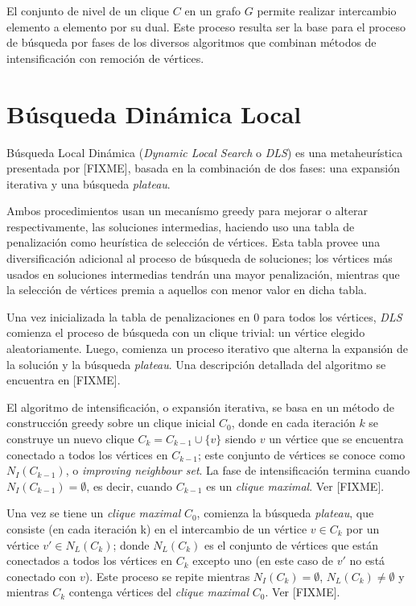 \documentclass[conference]{IEEEtran}
\begin{document}
El conjunto de nivel de un clique $C$ en un grafo $G$ permite realizar
intercambio elemento a elemento por su dual. Este proceso resulta ser
la base para el proceso de búsqueda por fases de los diversos
algoritmos que combinan métodos de intensificación con remoción de
vértices.

\section{Búsqueda Dinámica Local}
\label{sec:dls}Búsqueda Local Dinámica (\emph{Dynamic Local Search} o
\emph{DLS}) es una metaheurística presentada por [FIXME], basada en la
combinación de dos fases: una expansión iterativa y una búsqueda
\emph{plateau}.

Ambos procedimientos usan un mecanísmo greedy para mejorar o alterar
respectivamente, las soluciones intermedias, haciendo uso una tabla de
penalización como heurística de selección de vértices. Esta tabla
provee una diversificación adicional al proceso de búsqueda de
soluciones; los vértices más usados en soluciones intermedias tendrán
una mayor penalización, mientras que la selección de vértices premia a
aquellos con menor valor en dicha tabla.

Una vez inicializada la tabla de penalizaciones en $0$ para todos los
vértices, \emph{DLS} comienza el proceso de búsqueda con un clique
trivial: un vértice elegido aleatoriamente. Luego, comienza un proceso
iterativo que alterna la expansión de la solución y la búsqueda
\emph{plateau}. Una descripción detallada del algoritmo se encuentra
en [FIXME].

El algoritmo de intensificación, o expansión iterativa, se basa en un
método de construcción greedy sobre un clique inicial $C_0$, donde en
cada iteración $k$ se construye un nuevo clique $C_k = C_{k-1} \cup
\lbrace v \rbrace$ siendo $v$ un vértice que se encuentra conectado a
todos los vértices en $C_{k-1}$; este conjunto de vértices se conoce 
como $N_I(C_{k-1})$, o \emph{improving neighbour set}. La fase de
intensificación termina cuando $N_I(C_{k-1}) = \emptyset$, es decir,
cuando $C_{k-1}$ es un \emph{clique maximal}. Ver [FIXME].

Una vez se tiene un \emph{clique maximal} $C_0$, comienza la búsqueda
\emph{plateau}, que consiste (en cada iteración k) en el intercambio
de un vértice $v \in C_k$ por un vértice $v' \in N_L(C_k)$; donde
$N_L(C_k)$ es el conjunto de vértices que están conectados a todos
los vértices en $C_k$ excepto uno (en este caso de $v'$ no está
conectado con $v$). Este proceso se repite mientras $N_I(C_k) =
\emptyset$, $N_L(C_k) \neq \emptyset$ y mientras $C_k$ contenga
vértices del \emph{clique maximal} $C_0$. Ver [FIXME].
\end{document}
